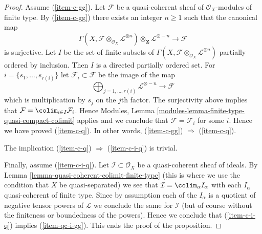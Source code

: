 \begin{proof}
\medskip\noindent
Assume (\ref{item-c-gg}). Let $\mathcal{F}$ be a quasi-coherent
sheaf of $\mathcal{O}_X$-modules of finite type.
By (\ref{item-c-gg}) there exists an integer $n \geq 1$ such that
the canonical map
$$
\Gamma(X, \mathcal{F} \otimes_{\mathcal{O}_X} \mathcal{L}^{\otimes n})
\otimes_{\mathbf{Z}} \mathcal{L}^{\otimes -n}
\longrightarrow
\mathcal{F}
$$
is surjective. Let $I$ be the set of finite subsets of
$\Gamma(X, \mathcal{F} \otimes_{\mathcal{O}_X} \mathcal{L}^{\otimes n})$
partially ordered by inclusion. Then $I$ is a directed partially ordered set.
For $i = \{s_1, \ldots, s_{r(i)}\}$ let $\mathcal{F}_i \subset \mathcal{F}$
be the image of the map
$$
\bigoplus\nolimits_{j = 1, \ldots, r(i)} \mathcal{L}^{\otimes -n}
\longrightarrow
\mathcal{F}
$$
which is multiplication by $s_j$ on the $j$th factor. The surjectivity above
implies that $\mathcal{F} = \colim_{i \in I} \mathcal{F}_i$.
Hence Modules, Lemma \ref{modules-lemma-finite-type-quasi-compact-colimit}
applies and we conclude that
$\mathcal{F} = \mathcal{F}_i$ for some $i$.
Hence we have proved (\ref{item-c-q}). In other words,
(\ref{item-c-gg}) $\Rightarrow$ (\ref{item-c-q}).

\medskip\noindent
The implication (\ref{item-c-q}) $\Rightarrow$ (\ref{item-c-i-q}) is trivial.

\medskip\noindent
Finally, assume (\ref{item-c-i-q}).
Let $\mathcal{I} \subset \mathcal{O}_X$ be a quasi-coherent sheaf
of ideals. By Lemma \ref{lemma-quasi-coherent-colimit-finite-type}
(this is where we use the condition that $X$ be quasi-separated)
we see that $\mathcal{I} = \colim_\alpha I_\alpha$ with
each $I_\alpha$ quasi-coherent of finite type. Since by assumption each of
the $I_\alpha$ is a quotient of negative tensor powers of
$\mathcal{L}$ we conclude the same for $\mathcal{I}$ (but of course
without the finiteness or boundedness of the powers). Hence
we conclude that (\ref{item-c-i-q}) implies (\ref{item-qc-i-gg}).
This ends the proof of the proposition.
\end{proof}
